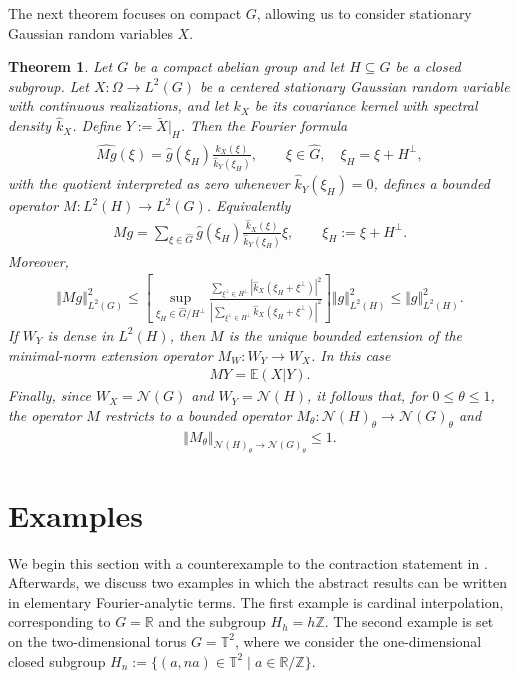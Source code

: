\documentclass{article}
\newtheorem{theorem}{Theorem}[section]
\newcommand{\E}{\mathbb{E}}
\begin{document}
The next theorem focuses on compact $G$, allowing us to consider stationary Gaussian random variables $X$.

\begin{theorem}\label{Theorem:MainCompactResult}
    Let $G$ be a compact abelian group and let $H\subseteq G$ be a closed subgroup. Let
$X:\Omega\to L^2(G)$ be a centered stationary Gaussian random variable with continuous realizations, and let $k_X$ be its covariance kernel with spectral density $\hat k_X$. Define $Y:=\tilde{X}|_H$. Then the Fourier formula 
\begin{align*}
    \widehat{Mg}(\xi)= \hat{g}(\xi_H) \frac{\hat{k}_X(\xi)}{\hat{k}_Y(\xi_H)}, \qquad \xi \in \hat{G}, \quad \xi_H =\xi+H^\perp,
\end{align*}
with the quotient interpreted as zero whenever $\hat{k}_Y(\xi_H)=0$, defines a bounded operator $M:L^2(H) \to L^2(G)$. Equivalently 
\begin{align*}
    Mg
=
\sum_{\xi\in\widehat G}
\hat g(\xi_H)
\frac{\hat k_X(\xi)}
{\hat k_{Y}(\xi_H)}
\xi,
\qquad
\xi_H:=\xi+H^\perp.
\end{align*} 
Moreover, 
\begin{align*}
  \Vert  Mg\Vert_{L^2(G)}^2
\leq
\left[
\sup_{\xi_H\in\hat G/H^\perp}
\frac{
\sum_{\xi^\perp\in H^\perp}
|\hat k_X(\xi_H+\xi^\perp)|^2
}{
\left|
\sum_{\xi^\perp\in H^\perp}
\hat k_X(\xi_H+\xi^\perp)
\right|^2
}
\right]
\Vert g\Vert_{L^2(H)}^2
\leq
\Vert g\Vert_{L^2(H)}^2 .
\end{align*}
If $W_Y$ is dense in $L^2(H)$, then $M$ is the unique bounded extension of the minimal-norm extension operator $M_W:W_Y \to W_X$. In this case 
\begin{align*}
    MY= \E(X \vert Y).
\end{align*} 
Finally, since $W_X=\mathcal{N}(G)$ and $W_Y=\mathcal{N}(H)$, it follows that, for $0 \leq \theta \leq 1$, the operator $M$ restricts to a bounded operator $M_\theta:\mathcal{N}(H)_\theta \to \mathcal{N}(G)_\theta$ and
\begin{align*}
    \Vert M_\theta \Vert_{\mathcal{N}(H)_\theta \to \mathcal{N}(G)_\theta} \leq 1.
\end{align*}
\end{theorem}

\color{black}
\section{Examples}\label{sec:examples}\label{sec:4}

We begin this section with a counterexample to the contraction statement in \cite[Theorem 2.4]{lagatta2013continuous}. Afterwards, we discuss two examples in which the abstract results can be written in elementary Fourier-analytic terms. The first example is cardinal interpolation, corresponding to $G=\mathbb R$ and the subgroup $H_h=h\mathbb Z$. The second example is set on the two-dimensional torus $G=\mathbb T^2$, where we consider the one-dimensional closed subgroup $H_n:=\{(a,na)\in\mathbb T^2\mid a\in\mathbb R/\mathbb Z\}$.
\end{document}
